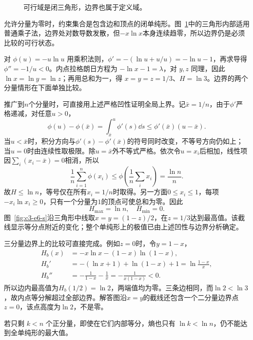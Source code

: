 \begin{figure}[H]\centering
{}
\caption{可行域是闭三角形，边界也属于定义域。}\label{fig:c3-e6-q}
\end{figure}
\begin{solution}
允许分量为零时，约束集合是包含边和顶点的闭单纯形。图~\ref{fig:c3-e6-q}中的三角形内部适用普通乘子法，边界处对数导数发散，但$-x\ln x$本身连续趋零，所以边界仍是必须比较的可行状态。


对 $\phi(u)=-u\ln u$ 用乘积法则，$\phi'=-(\ln u+u/u)=-\ln u-1$，再求导得 $\phi''=-1/u<0$。内点拉格朗日方程为 $-\ln x-1=\lambda$，对 $y,z$ 同理，因此 $\ln x=\ln y=\ln z$；再用总和为一，得 $x=y=z=1/3$、$H=\ln3$。边界的两个分量情形在下面单独比较。

推广到$n$个分量时，可直接用上述严格凹性证明全局上界。记$\bar x=1/n$，由于$\phi'$严格递减，对任意$u>0$，
\[
 \phi(u)-\phi(\bar x)
 =\int_{\bar x}^{u}\phi'(s)\dd s
 \le\phi'(\bar x)(u-\bar x).
\]
当$u<\bar x$时，积分方向与$\phi'(s)-\phi'(\bar x)$的符号同时改变，不等号方向仍如上；当$u=0$时由连续性取极限。除$u=\bar x$外不等式严格。依次令$u=x_i$后相加，线性项因$\sum_i(x_i-\bar x)=0$相消，所以
\[\frac1n\sum_{i=1}^n\phi(x_i)\le\phi\!\left(\frac1n\sum_i x_i\right)=\frac{\ln n}{n}.
\]
故$H\le\ln n$，等号仅在所有$x_i=1/n$时取得。另一方面$0\le x_i\le1$，每项$-x_i\ln x_i\ge0$，只有一个分量为$1$的顶点可使总和为零。因此
\[\boxed{H_{\max}=\ln n,\quad H_{\min}=0}.\]
图~\ref{fig:c3-e6-s}沿三角形中线取$x=y=(1-z)/2$，在$z=1/3$达到最高值。该截线显示等分点附近的变化；整个单纯形上的极值已由上述凹性与边界分析确定。


三分量边界上的比较可直接完成。例如$z=0$时，令$y=1-x$，
\[
\begin{aligned}
H_b(x)&=-x\ln x-(1-x)\ln(1-x),\\
H_b'&=-(\ln x+1)+\ln(1-x)+1=\ln\frac{1-x}{x},\\
H_b''&=-\frac1{1-x}-\frac1x=-\frac1{x(1-x)}<0.
\end{aligned}
\]
所以边内最高值为$H_b(1/2)=\ln2$，两端值均为零。三条边相同，而$\ln2<\ln3$，故内点等分解超过全部边界。解答图沿$x=y$的截线还包含一个二分量边界点$z=0$，该点高度为$\ln2$，不是零。

若只剩 $k<n$ 个正分量，即使在它们内部等分，熵也只有 $\ln k<\ln n$，仍不能达到全单纯形的最大值。


\end{solution}
